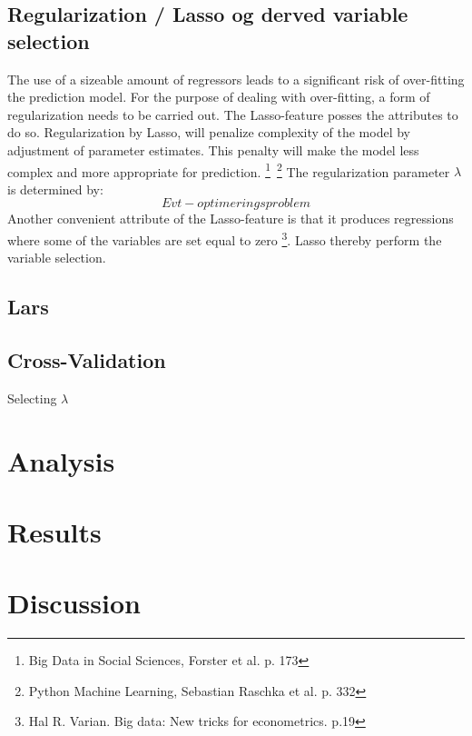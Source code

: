 \documentclass[12pt,a4paper]{article}
\begin{document}
\subsection{Regularization / Lasso og derved variable selection}
The use of a sizeable amount of regressors leads to a significant risk of over-fitting the prediction model. 
For the purpose of dealing with over-fitting, a form of regularization needs to be carried out. The Lasso-feature posses the attributes to do so. Regularization by Lasso, will penalize complexity of the model by adjustment of parameter estimates. This penalty will make the model less complex and more appropriate for prediction. \footnote{Big Data in Social Sciences, Forster et al. p. 173}\, \footnote{Python Machine Learning, Sebastian Raschka et al. p. 332}
\newline The regularization parameter $\lambda$ is determined by: $$Evt-optimeringsproblem$$
Another convenient attribute of the Lasso-feature is that it produces regressions where some of the variables are set equal to zero \footnote{Hal R. Varian. Big data: New tricks for econometrics. p.19}. Lasso thereby perform the variable selection.   

\subsection{Lars}

\subsection{Cross-Validation}
Selecting $\lambda$ 



\section{Analysis}

\section{Results}

\section{Discussion}
\end{document}
